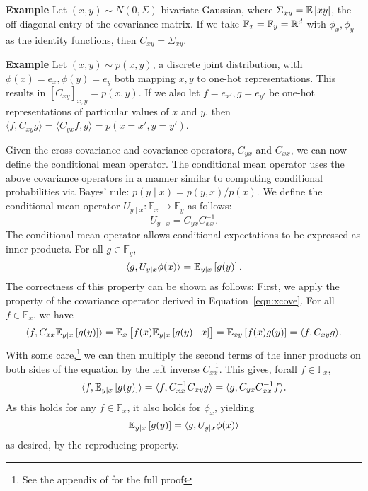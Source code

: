 \documentclass{article}
\begin{document}
\textbf{Example}
Let $(x,y)\sim N(0,\Sigma)$ bivariate Gaussian,
where $\Sigma_{xy} = \mathbb{E}\left[xy\right]$, the off-diagonal
entry of the covariance matrix.
If we take $\mathbb{F}_x=\mathbb{F}_y=\mathbb{R}^d$
with $\phi_x,\phi_y$ as the identity functions,
then $C_{xy} = \Sigma_{xy}$.

\textbf{Example}
Let $(x,y)\sim p(x,y)$, a discrete joint distribution,
with $\phi(x)=e_x,\phi(y)=e_y$ both mapping $x,y$ to one-hot representations.
This results in $[C_{xy}]_{x,y}=p(x,y)$.
If we also let $f=e_{x'},g=e_{y'}$ be one-hot representations of particular values of $x$ and $y$,
then $\langle f, C_{xy}g\rangle = \langle C_{yx}f, g\rangle= p(x=x',y=y')$.

Given the cross-covariance and covariance operators, $C_{yx}$ and $C_{xx}$,
we can now define the conditional mean operator.
The conditional mean operator uses the above covariance operators in a manner
similar to computing conditional probabilities via Bayes' rule: $p(y\mid x) = p(y,x)/p(x)$.
We define the conditional mean operator $U_{y\mid x}: \mathbb{F}_x\to\mathbb{F}_y$
as follows:
\begin{equation}
    \label{eqn:conditional-mean}
    U_{y\mid x} = C_{yx}C_{xx}^{-1}.
\end{equation}
The conditional mean operator allows conditional expectations to be
expressed as inner products.
For all $g \in \mathbb{F}_y$,
\begin{equation}
\label{eqn:conditional-expectation}
\langle g, U_{y\mid x}\phi(x) \rangle = \mathbb{E}_{y\mid x}\left[g(y)\right].
\end{equation}
The correctness of this property can be shown as follows:
First, we apply the property of the covariance operator derived in
Equation~\ref{eqn:xcove}. For all $f\in\mathbb{F}_x$, we have
\begin{equation}
\label{eqn:prf-conditional-expectation}
    \langle f, C_{xx}\mathbb{E}_{y\mid x}\left[g(y)\right]\rangle
    = \mathbb{E}_{x}\left[f(x)\mathbb{E}_{y\mid x}\left[g(y)\mid x\right]\right]
    = \mathbb{E}_{xy}\left[f(x)g(y)\right]
    = \langle f, C_{xy}g\rangle.
\end{equation}
With some care,\footnote{
See the appendix of \citet{fukumizu2004kernel} for the full proof}
we can then multiply the second terms of the inner products on both sides
of the equation by the left inverse $C_{xx}^{-1}$.
This gives, forall $f\in\mathbb{F}_x$,
$$\langle f, \mathbb{E}_{y\mid x}\left[g(y)\right]\rangle = \langle f, C_{xx}^{-1}C_{xy}g \rangle
= \langle g, C_{yx}C_{xx}^{-1}f\rangle.$$
As this holds for any $f\in\mathbb{F}_x$, it also holds for $\phi_x$,
yielding
$$
\mathbb{E}_{y\mid x}\left[g(y)\right] = \langle g, U_{y\mid x}\phi(x)\rangle
$$
as desired, by the reproducing property.
\end{document}
